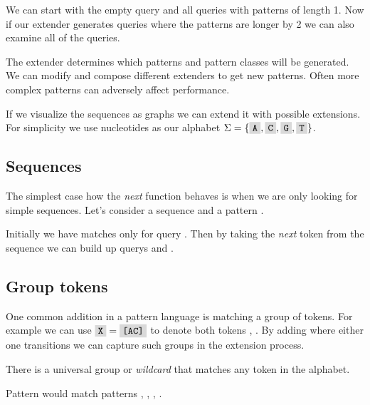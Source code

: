 \begin{exmp}
We can start with the empty query and all queries with patterns of length 1. Now if our extender generates queries where the patterns are longer by 2 we can also examine all of the queries.
\end{exmp}

The extender determines which patterns and pattern classes will be generated. We can modify and compose different extenders to get new patterns. Often more complex patterns can adversely affect performance.


If we visualize the sequences as graphs we can extend it with possible extensions. For simplicity we use nucleotides as our alphabet $\Sigma = \{ \R{A}, \R{C}, \R{G}, \R{T} \}$.

\subsection{Sequences}

The simplest case how the \emph{next} function behaves is when we are only looking for simple sequences. Let's consider a sequence  and a pattern .

\begin{figure}[H]
	
\end{figure}

Initially we have matches only for query . Then by taking the \emph{next} token from the sequence we can build up querys  and .

\subsection{Group tokens}

One common addition in a pattern language is matching a group of tokens. For example we can use $\R{X} = \R{[AC]}$ to denote both tokens , . By adding where either one transitions we can capture such groups in the extension process.

\begin{figure}[H]
	
\end{figure}

There is a universal group  or \emph{wildcard} that matches any token in the alphabet.

\begin{exmp}
Pattern  would match patterns , , , .
\end{exmp}

